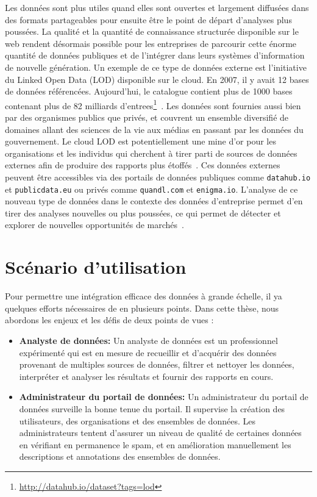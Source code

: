 Les donn\'{e}es sont plus utiles quand elles sont ouvertes et largement diffus\'{e}es dans des formats partageables pour ensuite être le point de d\'{e}part d'analyses plus pouss\'{e}es. La qualit\'{e} et la quantit\'{e} de connaissance structur\'{e}e disponible sur le web rendent d\'{e}sormais possible pour les entreprises de parcourir cette \'{e}norme quantit\'{e} de donn\'{e}es publiques et de l'int\'{e}grer dans leurs syst\`{e}mes d'information de nouvelle g\'{e}n\'{e}ration. Un exemple de ce type de donn\'{e}es externe est l'initiative du Linked Open Data (LOD) disponible sur le cloud. En 2007, il y avait 12 bases de donn\'{e}es r\'{e}f\'{e}renc\'{e}es. Aujourd'hui, le catalogue contient plus de 1000 bases contenant plus de 82 milliards d'entrees\footnote{\url{http://datahub.io/dataset?tags=lod}}~\cite{Bizer:IJSWIS:09}. Les donn\'{e}es sont fournies aussi bien par des organismes publics que priv\'{e}s, et couvrent un ensemble diversifi\'{e} de domaines allant des sciences de la vie aux m\'{e}dias en passant par les donn\'{e}es du gouvernement. Le cloud LOD est potentiellement une mine d'or pour les organisations et les individus qui cherchent à tirer parti de sources de donn\'{e}es externes afin de produire des rapports plus \'{e}toff\'{e}s~\cite{Boyd:Article:11}. Ces donn\'{e}es externes peuvent être accessibles via des portails de donn\'{e}es publiques comme \texttt {datahub.io} et \texttt {publicdata.eu} ou priv\'{e}s comme \texttt{quandl.com} et \texttt{enigma.io}. L'analyse de ce nouveau type de donn\'{e}es dans le contexte des donn\'{e}es d'entreprise permet d'en tirer des analyses nouvelles ou plus pouss\'{e}es, ce qui permet de d\'{e}tecter et explorer de nouvelles opportunit\'{e}s de march\'{e}s~\cite{LaValle:MIT:11}.

\section{Sc\'{e}nario d'utilisation}

Pour permettre une int\'{e}gration efficace des donn\'{e}es à grande \'{e}chelle, il ya quelques efforts n\'{e}cessaires de en plusieurs points. Dans cette th\`{e}se, nous abordons les enjeux et les d\'{e}fis de deux points de vues :

\begin{itemize}
	\item \textbf{Analyste de donn\'{e}es:} Un analyste de donn\'{e}es est un professionnel exp\'{e}riment\'{e} qui est en mesure de recueillir et d'acqu\'{e}rir des donn\'{e}es provenant de multiples sources de donn\'{e}es, filtrer et nettoyer les donn\'{e}es, interpr\'{e}ter et analyser les r\'{e}sultats et fournir des rapports en cours.
	\item \textbf{Administrateur du portail de donn\'{e}es:} Un administrateur du portail de donn\'{e}es surveille la bonne tenue du portail. Il supervise la cr\'{e}ation des utilisateurs, des organisations et des ensembles de donn\'{e}es. Les administrateurs tentent d'assurer un niveau de qualit\'{e} de certaines donn\'{e}es en v\'{e}rifiant en permanence le spam, et en am\'{e}lioration manuellement les descriptions et annotations des ensembles de donn\'{e}es.
\end{itemize}

